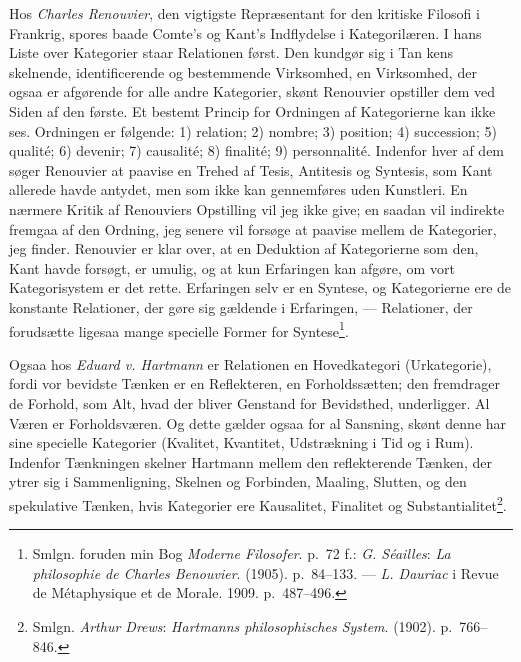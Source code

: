 \documentclass[12pt,a4paper]{book}
\newcommand{\opage}[1]{\marginnote{\footnotesize\textit{[#1]}}}
\begin{document}
Hos \emph{Charles Renouvier}, den vigtigste Repræsentant for den kritiske
Filosofi i Frankrig, spores baade Comte's og Kant's Indflydelse i
Kategorilæren. I hans Liste over Kategorier staar Relationen først. Den
kundgør sig i Tan%
\opage{152}kens skelnende, identificerende og bestemmende Virksomhed,
en Virksomhed, der ogsaa er afgørende for alle andre Kategorier, skønt
Renouvier opstiller dem ved Siden af den første. Et bestemt Princip for
Ordningen af Kategorierne kan ikke ses. Ordningen er følgende: 1) relation;
2) nombre; 3) position; 4) succession; 5) qualité; 6) devenir; 7) causalité;
8) finalité; 9) personnalité. Indenfor hver af dem søger Renouvier at
paavise en Trehed af Tesis, Antitesis og Syntesis, som Kant allerede havde
antydet, men som ikke kan gennemføres uden Kunstleri. En nærmere Kritik af
Renouviers Opstilling vil jeg ikke give; en saadan vil indirekte fremgaa af
den Ordning, jeg senere vil forsøge at paavise mellem de Kategorier, jeg
finder. Renouvier er klar over, at en Deduktion af Kategorierne som den,
Kant havde forsøgt, er umulig, og at kun Erfaringen kan afgøre, om vort
Kategorisystem er det rette. Erfaringen selv er en Syntese, og Kategorierne
ere de konstante Relationer, der gøre sig gældende i Erfaringen, ---
Relationer, der forudsætte ligesaa mange specielle Former for
Syntese\footnote{Smlgn. foruden min Bog \emph{Moderne Filosofer}. p.~72 f.: \emph{G. Séailles}: \emph{La philosophie de Charles Benouvier}. (1905). p.~84--133. --- \emph{L. Dauriac} i Revue de Métaphysique et de Morale. 1909. p.~487--496.}.

Ogsaa hos \emph{Eduard v. Hartmann} er Relationen en Hovedkategori
(Urkategorie), fordi vor bevidste Tænken er en Reflekteren, en
Forholdssætten; den fremdrager de Forhold, som Alt, hvad der bliver Genstand
for Bevidsthed, underligger. Al Væren er Forholdsværen. Og dette gælder
ogsaa for al Sansning, skønt denne har sine specielle Kategorier (Kvalitet,
Kvantitet, Udstrækning i Tid og i Rum). Indenfor Tænkningen skelner Hartmann
mellem den reflekterende Tænken, der ytrer sig i Sammenligning, Skelnen og
Forbinden, Maaling, Slutten, og den spekulative Tænken, hvis Kategorier ere
Kausalitet, Finalitet og Substantialitet\footnote{Smlgn. \emph{Arthur Drews}: \emph{Hartmanns philosophisches System}. (1902). p.~766--846.}.
\end{document}
